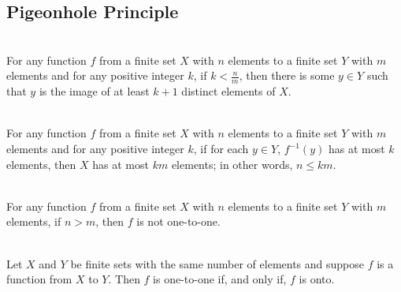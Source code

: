 \documentclass[12pt]{article}
\begin{document}
\subsection{Pigeonhole Principle}
\begin{theorem}
\hfill\\
\normalfont For any function $f$ from a finite set $X$ with $n$ elements to a finite set $Y$ with $m$ elements and for any positive integer $k$, if $k<\frac{n}{m}$, then there is some $y\in Y$ such that $y$ is the image of at least $k+1$ distinct elements of $X$.
\end{theorem}
\begin{theorem}
\hfill\\
\normalfont For any function $f$ from a finite set $X$ with $n$ elements to a finite set $Y$ with $m$ elements and for any positive integer $k$, if for each $y\in Y$, $f^{-1}(y)$ has at most $k$ elements, then $X$ has at most $km$ elements; in other words, $n\leq km$.
\end{theorem}
\begin{theorem}
\hfill\\
\normalfont For any function $f$ from a finite set $X$ with $n$ elements to a finite set $Y$ with $m$ elements, if $n>m$, then $f$ is not one-to-one.
\end{theorem}
\begin{theorem}
\hfill\\
\normalfont Let $X$ and $Y$ be finite sets with the same number of elements and suppose $f$ is a function from $X$ to $Y$. Then $f$ is one-to-one if, and only if, $f$ is onto.
\end{theorem}
\end{document}
